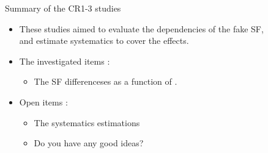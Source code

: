 \documentclass[aspectratio=46, dvipdfmx, 10pt, t]{beamer} %
\begin{document}
\begin{frame}{Summary of the CR1-3 studies}
  \begin{itemize}
    \item These studies aimed to evaluate the \sT dependencies of the fake SF,  \\
      and estimate systematics to cover the effects.
    \item The investigated items :
      \begin{itemize}
        \item The SF differenceses as a function of \tauhad \pT \hyperlink{fake_sf_cr1_cr2_c3}{}.
      \end{itemize}

      \vspp
    \item Open items :
      \begin{itemize}
        \item The systematics estimations 
        \item Do you have any good ideas?
      \end{itemize}
  \end{itemize}
\end{frame}


\end{document}
